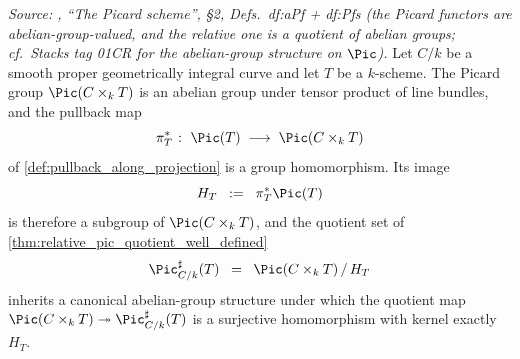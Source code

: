 \begin{lemma}\leanok
  \label{lem:rel_pic_sharp_groupoid}

  \textit{Source: \cite{kleiman-picard}, ``The Picard scheme'', \S 2,
  Defs.~df:aPf + df:Pfs (the Picard functors are abelian-group-valued, and the
  relative one is a quotient of abelian groups; cf.\ Stacks tag 01CR for the
  abelian-group structure on \(\Pic\)).}
  Let \(C/k\) be a smooth proper geometrically integral curve and let \(T\) be a
  \(k\)-scheme. The Picard group \(\Pic(C \times_k T)\) is an abelian group under
  tensor product of line bundles, and the pullback map
  \[
    \pi_T^* \;\colon\; \Pic(T) \;\longrightarrow\; \Pic(C \times_k T)
  \]
  of \cref{def:pullback_along_projection} is a group homomorphism. Its image
  \[
    H_T \;\;:=\;\; \pi_T^* \Pic(T)
  \]
  is therefore a subgroup of \(\Pic(C \times_k T)\), and the quotient set of
  \cref{thm:relative_pic_quotient_well_defined}
  \[
    \Pic^\sharp_{C/k}(T) \;\;=\;\; \Pic(C \times_k T) \, / \, H_T
  \]
  inherits a canonical abelian-group structure under which the quotient map
  \(\Pic(C \times_k T) \twoheadrightarrow \Pic^\sharp_{C/k}(T)\) is a surjective
  homomorphism with kernel exactly \(H_T\).
\end{lemma}

